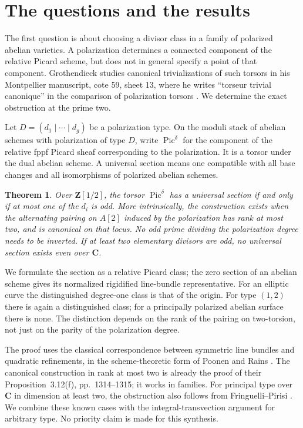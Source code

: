 \documentclass[11pt]{article}
\newtheorem{theorem}{Theorem}[section]
\theoremstyle{remark}\newtheorem{remark}[theorem]{Remark}
\newcommand{\Z}{\mathbf Z}
\newcommand{\Pic}{\operatorname{Pic}}
\begin{document}
\section{The questions and the results}

The first question is about choosing a divisor class in a family of polarized abelian varieties. A polarization determines a connected component of the relative Picard scheme, but does not in general specify a point of that component. Grothendieck studies canonical trivializations of such torsors in his Montpellier manuscript, cote 59, sheet 13, where he writes ``torseur trivial canonique'' in the comparison of polarization torsors \cite{Groth59}. We determine the exact obstruction at the prime two.

Let $D=(d_1\mid\cdots\mid d_g)$ be a polarization type. On the moduli stack of abelian schemes with polarization of type $D$, write $\Pic^\delta$ for the component of the relative fppf Picard sheaf corresponding to the polarization. It is a torsor under the dual abelian scheme. A universal section means one compatible with all base changes and all isomorphisms of polarized abelian schemes.

\begin{theorem}\label{thm:polarization}
Over $\Z[1/2]$, the torsor $\Pic^\delta$ has a universal section if and only if at most one of the $d_i$ is odd. More intrinsically, the construction exists when the alternating pairing on $A[2]$ induced by the polarization has rank at most two, and is canonical on that locus. No odd prime dividing the polarization degree needs to be inverted. If at least two elementary divisors are odd, no universal section exists even over $\mathbf C$.
\end{theorem}

We formulate the section as a relative Picard class; the zero section of an abelian scheme gives its normalized rigidified line-bundle representative. For an elliptic curve the distinguished degree-one class is that of the origin. For type $(1,2)$ there is again a distinguished class; for a principally polarized abelian surface there is none. The distinction depends on the rank of the pairing on two-torsion, not just on the parity of the polarization degree.

The proof uses the classical correspondence between symmetric line bundles and quadratic refinements, in the scheme-theoretic form of Poonen and Rains \cite[Proposition 3.6 and diagram (3.7), pp.~1312--1313]{PR}. The canonical construction in rank at most two is already the proof of their Proposition~3.12(f), pp.~1314--1315; it works in families. For principal type over $\mathbf C$ in dimension at least two, the obstruction also follows from Fringuelli--Pirisi \cite[Theorem~C, author version p.~3]{FP}. We combine these known cases with the integral-transvection argument for arbitrary type. No priority claim is made for this synthesis.
\end{document}
